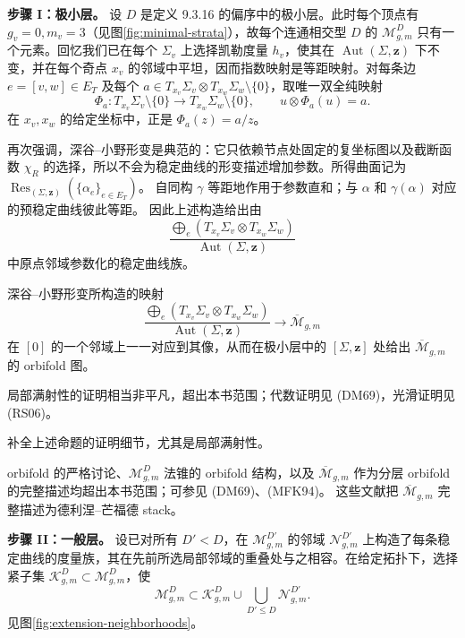 \textbf{步骤 I：极小层。}
设 $D$ 是定义 9.3.16 的偏序中的极小层。此时每个顶点有
$g_v=0,m_v=3$（见图\ref{fig:minimal-strata}），故每个连通相交型 $D$ 的
$\mathcal M_{g,m}^D$ 只有一个元素。回忆我们已在每个 $\Sigma_v$ 上选择凯勒度量
$h_v$，使其在 $\operatorname{Aut}(\Sigma,\boldsymbol z)$ 下不变，并在每个奇点
$x_v$ 的邻域中平坦，因而指数映射是等距映射。对每条边
$e=[v,w]\in E_T$ 及每个
$a\in T_{x_v}\Sigma_v\otimes T_{x_w}\Sigma_w\setminus\{0\}$，取唯一双全纯映射
\[
 \Phi_a:T_{x_v}\Sigma_v\setminus\{0\}
 \longrightarrow T_{x_w}\Sigma_w\setminus\{0\},
 \qquad u\otimes\Phi_a(u)=a.
\]
在 $x_v,x_w$ 的给定坐标中，正是 $\Phi_a(z)=a/z$。

再次强调，深谷--小野形变是典范的：它只依赖节点处固定的复坐标图以及截断函数
$\chi_R$ 的选择，所以不会为稳定曲线的形变描述增加参数。所得曲面记为
$\operatorname{Res}_{(\Sigma,\boldsymbol z)}(\{\alpha_e\}_{e\in E_T})$。
自同构 $\gamma$ 等距地作用于参数直和；与 $\alpha$ 和 $\gamma(\alpha)$ 对应的预稳定曲线彼此等距。
因此上述构造给出由
\[
 \frac{\bigoplus_e(T_{x_v}\Sigma_v\otimes T_{x_w}\Sigma_w)}
 {\operatorname{Aut}(\Sigma,\boldsymbol z)}
\]
中原点邻域参数化的稳定曲线族。

\begin{proposition}\label{prop:fukaya-ono-chart-minimal-stratum}
深谷--小野形变所构造的映射
\[
 \frac{\bigoplus_e(T_{x_v}\Sigma_v\otimes T_{x_w}\Sigma_w)}
 {\operatorname{Aut}(\Sigma,\boldsymbol z)}
 \longrightarrow\overline{\mathcal M}_{g,m}
\]
在 $[0]$ 的一个邻域上一一对应到其像，从而在极小层中的
$[\Sigma,\boldsymbol z]$ 处给出 $\overline{\mathcal M}_{g,m}$ 的 orbifold 图。
\end{proposition}

局部满射性的证明相当非平凡，超出本书范围；代数证明见 (DM69)，光滑证明见 (RS06)。
\begin{exercise}\label{ex:local-surjectivity-fukaya-ono-chart}
补全上述命题的证明细节，尤其是局部满射性。
\end{exercise}

orbifold 的严格讨论、$\mathcal M_{g,m}^D$ 法锥的 orbifold 结构，以及
$\overline{\mathcal M}_{g,m}$ 作为分层 orbifold 的完整描述均超出本书范围；可参见 (DM69)、(MFK94)。
这些文献把 $\overline{\mathcal M}_{g,m}$ 完整描述为德利涅--芒福德 stack。

\textbf{步骤 II：一般层。}
设已对所有 $D'<D$，在 $\mathcal M_{g,m}^{D'}$ 的邻域 $\mathcal N_{g,m}^{D'}$ 上构造了每条稳定曲线的度量族，其在先前所选局部邻域的重叠处与之相容。在给定拓扑下，选择紧子集
$\mathcal K_{g,m}^D\subset\mathcal M_{g,m}^D$，使
\[
 \mathcal M_{g,m}^D\subset\mathcal K_{g,m}^D
 \cup\bigcup_{D'\le D}\mathcal N_{g,m}^{D'}.
\]
见图\ref{fig:extension-neighborhoods}。

